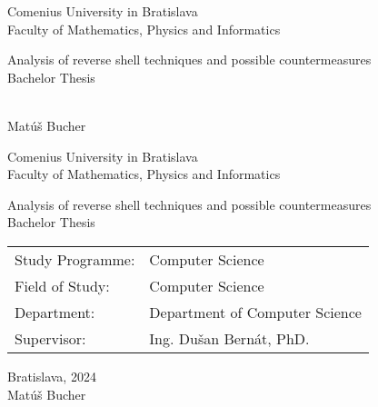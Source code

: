\documentclass[12pt, twoside]{book}
\def\mfrok{2024}
\def\mfnazov{Analysis of reverse shell techniques and possible countermeasures}
\def\mftyp{Bachelor Thesis}
\def\mfautor{Matúš Bucher}
\def\mfskolitel{Ing. Dušan Bernát, PhD.}
\def\mfmiesto{Bratislava, \mfrok}
\def\mfodbor{Computer Science}
\def\program{Computer Science }
\def\mfpracovisko{ Department of Computer Science }
\begin{document}
     
\frontmatter
\pagestyle{empty}


\begin{center}
  \sc\large
  Comenius University in Bratislava\\
  Faculty of Mathematics, Physics and Informatics

\vfill

{\LARGE\mfnazov}\\
\mftyp
\end{center}

\vfill

{\sc\large 
\noindent \mfrok\\
\mfautor
}

\cleardoublepage


\noindent

\begin{center}
\sc  
\large
  Comenius University in Bratislava\\
  Faculty of Mathematics, Physics and Informatics

\vfill

{\LARGE\mfnazov}\\
\mftyp
\end{center}

\vfill

\noindent
\begin{tabular}{ll}
Study Programme: & \program \\
Field of Study: & \mfodbor \\
Department: & \mfpracovisko \\
Supervisor: & \mfskolitel \\
\end{tabular}

\vfill


\noindent \mfmiesto\\
\mfautor

\cleardoublepage



\newpage
\setcounter{page}{3}

\end{document}
